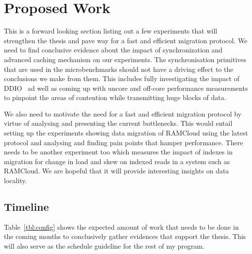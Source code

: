 
\chapter{Proposed Work}

This is a forward looking section listing out a few experiments that will
strengthen the thesis and pave way for a fast and efficient migration protocol.
We need to find conclusive evidence about the impact of synchronization and 
advanced caching mechanism on our experiments. The synchronisation primitives 
that are used in the microbenchmarks should not have a driving effect to the 
conclusions we make from them. This includes fully investigating the impact
of DDIO~\cite{ddio} ad well as coming up with uncore and off-core performance
measurements to pinpoint the areas of contention while transmitting huge blocks
of data.

We also need to motivate the need for a fast and efficient migration protocol 
by virtue of analysing and presenting the current bottlenecks. This would entail
setting up the experiments showing data migration of RAMCloud using the latest 
protocol and analysing and finding pain points that hamper performance. There needs
to be another experiment too which measures the impact of indexes in migration 
for change in load and skew on indexed reads in a system such as RAMCloud. We are
hopeful that it will provide interesting insights on data locality.

\section{Timeline}

Table~\ref{tbl:config} shows the expected amount of work that needs to be done 
in the coming months to conclusively gather evidences that support the thesis. 
This will also serve as the schedule guideline for the rest of my program.


